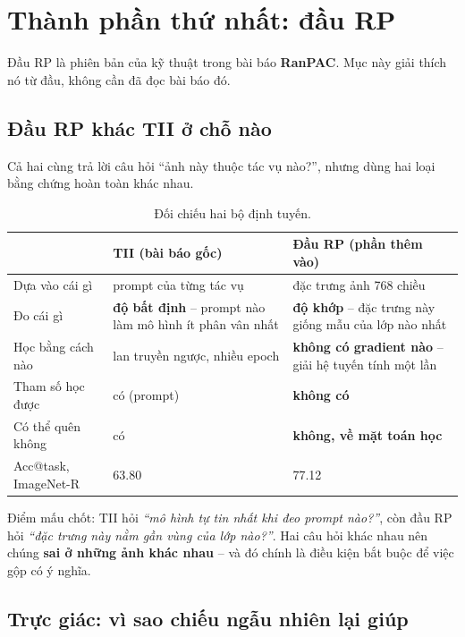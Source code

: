 \documentclass[11pt,a4paper]{article}
\begin{document}
\section{Thành phần thứ nhất: đầu RP}
\label{sec:dau-rp}

Đầu RP là phiên bản của kỹ thuật trong bài báo \textbf{RanPAC}. Mục này giải
thích nó từ đầu, không cần đã đọc bài báo đó.

\subsection{Đầu RP khác TII ở chỗ nào}

Cả hai cùng trả lời câu hỏi ``ảnh này thuộc tác vụ nào?'', nhưng dùng hai loại
bằng chứng hoàn toàn khác nhau.

\begin{table}[htbp]
\centering
\caption{Đối chiếu hai bộ định tuyến.}
\label{tab:tii-vs-rp}
\begin{tabular}{@{}p{3.1cm}p{5.1cm}p{5.6cm}@{}}
\toprule
 & TII (bài báo gốc) & Đầu RP (phần thêm vào) \\
\midrule
Dựa vào cái gì   & prompt của từng tác vụ & đặc trưng ảnh 768 chiều \\
Đo cái gì        & \textbf{độ bất định} -- prompt nào làm mô hình ít phân vân nhất
                 & \textbf{độ khớp} -- đặc trưng này giống mẫu của lớp nào nhất \\
Học bằng cách nào & lan truyền ngược, nhiều epoch
                 & \textbf{không có gradient nào} -- giải hệ tuyến tính một lần \\
Tham số học được & có (prompt) & \textbf{không có} \\
Có thể quên không & có & \textbf{không, về mặt toán học} \\
Acc@task, ImageNet-R & 63.80 & 77.12 \\
\bottomrule
\end{tabular}
\end{table}

Điểm mấu chốt: TII hỏi \emph{``mô hình tự tin nhất khi đeo prompt nào?''}, còn
đầu RP hỏi \emph{``đặc trưng này nằm gần vùng của lớp nào?''}. Hai câu hỏi khác
nhau nên chúng \textbf{sai ở những ảnh khác nhau} -- và đó chính là điều kiện bắt
buộc để việc gộp có ý nghĩa.

\subsection{Trực giác: vì sao chiếu ngẫu nhiên lại giúp}
\end{document}
